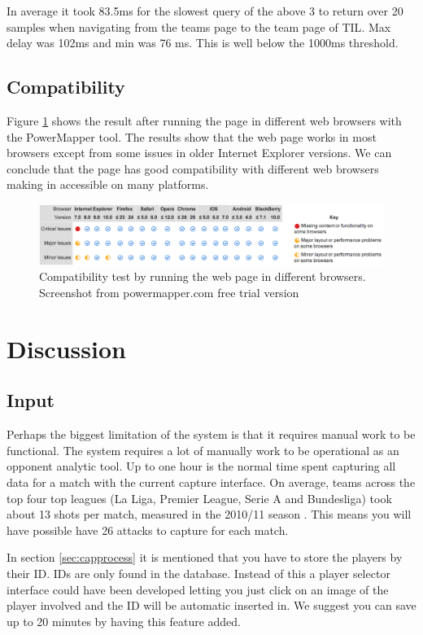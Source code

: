 In average it took 83.5ms for the slowest query of the above 3 to return over 20 samples when navigating from the teams page to the team page of \ac{TIL}. Max delay was 102ms and min was 76 ms. This is well below the 1000ms threshold.

\subsection{Compatibility}

Figure \ref{fig:compa} shows the result after running the page in different web browsers with the PowerMapper tool. The results show that the web page works in most browsers except from some issues in older Internet Explorer versions. We can conclude that the page has good compatibility with different web browsers making in accessible on many platforms.

\begin{figure}[ht!]
\centering
\includegraphics[width=1\textwidth]{images/evaluation/compa}
\caption{Compatibility test by running the web page in different browsers. Screenshot from powermapper.com free trial version}
\label{fig:compa}
\end{figure}

\section{Discussion}
\subsection{Input}

Perhaps the biggest limitation of the system is that it requires manual work to be functional. The system requires a lot of manually work to be operational as an opponent analytic tool. Up to one hour is the normal time spent capturing all data for a match with the current capture interface. On average, teams across the top four top leagues (La Liga, Premier League, Serie A and Bundesliga) took about 13 shots per match, measured in the 2010/11 season \cite{soccerbynumbers}. This means you will have possible have 26 attacks to capture for each match. 

In section \ref{sec:capprocess} it is mentioned that you have to store the players by their ID. IDs are only found in the database. Instead of this a player selector interface could have been developed letting you just click on an image of the player involved and the ID will be automatic inserted in. We suggest you can save up to 20 minutes by having this feature added.


